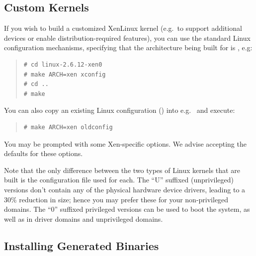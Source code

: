 \documentclass[11pt,twoside,final,openright]{report}
\begin{document}


\subsection{Custom Kernels}


If you wish to build a customized XenLinux kernel (e.g.\ to support
additional devices or enable distribution-required features), you can
use the standard Linux configuration mechanisms, specifying that the
architecture being built for is , e.g:
\begin{quote}
\begin{verbatim}
# cd linux-2.6.12-xen0
# make ARCH=xen xconfig
# cd ..
# make
\end{verbatim}
\end{quote}

You can also copy an existing Linux configuration () into
e.g.\  and execute:
\begin{quote}
\begin{verbatim}
# make ARCH=xen oldconfig
\end{verbatim}
\end{quote}

You may be prompted with some Xen-specific options. We advise accepting
the defaults for these options.

Note that the only difference between the two types of Linux kernels
that are built is the configuration file used for each. The ``U''
suffixed (unprivileged) versions don't contain any of the physical
hardware device drivers, leading to a 30\% reduction in size; hence you
may prefer these for your non-privileged domains. The ``0'' suffixed
privileged versions can be used to boot the system, as well as in driver
domains and unprivileged domains.

\subsection{Installing Generated Binaries}
\end{document}
